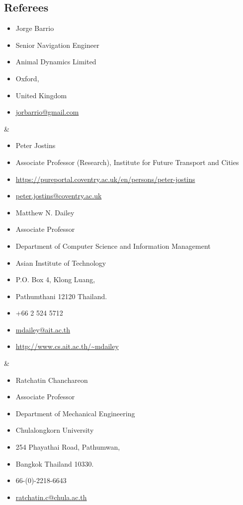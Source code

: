 \documentclass[margin]{res}
\begin{document}
\begin{resume}
\section{Referees}

\begin{ncolumn}{2}
\begin{itemize} \itemsep -3pt
  \item[] Jorge Barrio
  \item[] Senior Navigation Engineer
  \item[] Animal Dynamics Limited
  \item[] Oxford,
  \item[] United Kingdom
  \item[] \url{jorbarrio@gmail.com}
\end{itemize}
&
\begin{itemize} \itemsep -3pt
  \item[] Peter Jostins
  \item[] Associate Professor (Research), Institute for Future Transport and Cities
  \item[] \url{https://pureportal.coventry.ac.uk/en/persons/peter-jostins}
  \item[] \url{peter.jostins@coventry.ac.uk}
\end{itemize}
\end{ncolumn}

\begin{ncolumn}{2}
\begin{itemize} \itemsep -3pt
  \item[] Matthew N. Dailey
  \item[] Associate Professor
  \item[] Department of Computer Science and Information Management
  \item[] Asian Institute of Technology
  \item[] P.O. Box 4, Klong Luang,
  \item[] Pathumthani 12120 Thailand.
  \item[] +66 2 524 5712
  \item[] \url{mdailey@ait.ac.th}
  \item[] \url{http://www.cs.ait.ac.th/~mdailey}
\end{itemize}
&
\begin{itemize} \itemsep -3pt
  \item[] Ratchatin Chanchareon
  \item[] Associate Professor
  \item[] Department of Mechanical Engineering
  \item[] Chulalongkorn University
  \item[] 254 Phayathai Road, Pathumwan,
  \item[] Bangkok Thailand 10330.
  \item[] 66-(0)-2218-6643
  \item[] \url{ratchatin.c@chula.ac.th}
\end{itemize}
\end{ncolumn}


\end{resume}
\end{document}
